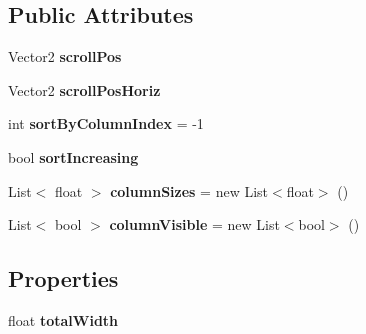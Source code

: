 \subsection*{Public Attributes}
\begin{DoxyCompactItemize}
\item 
\mbox{\label{class_editor_g_u_i_table_1_1_g_u_i_table_state_a5d522c1790784ff16db98b345b74a0ca}} 
Vector2 {\bfseries scroll\+Pos}
\item 
\mbox{\label{class_editor_g_u_i_table_1_1_g_u_i_table_state_ac9aaf765fd446c9e48b17b47528f647f}} 
Vector2 {\bfseries scroll\+Pos\+Horiz}
\item 
\mbox{\label{class_editor_g_u_i_table_1_1_g_u_i_table_state_ad4fe2697eec54139de525bb0b87be1b3}} 
int {\bfseries sort\+By\+Column\+Index} = -\/1
\item 
\mbox{\label{class_editor_g_u_i_table_1_1_g_u_i_table_state_a77f82460b4a1a57c23035e404ff47346}} 
bool {\bfseries sort\+Increasing}
\item 
\mbox{\label{class_editor_g_u_i_table_1_1_g_u_i_table_state_ade1dee36083109909f4bf31bd88d995e}} 
List$<$ float $>$ {\bfseries column\+Sizes} = new List$<$float$>$ ()
\item 
\mbox{\label{class_editor_g_u_i_table_1_1_g_u_i_table_state_a5351f180498096a8da853064d8a2e4d0}} 
List$<$ bool $>$ {\bfseries column\+Visible} = new List$<$bool$>$ ()
\end{DoxyCompactItemize}
\subsection*{Properties}
\begin{DoxyCompactItemize}
\item 
\mbox{\label{class_editor_g_u_i_table_1_1_g_u_i_table_state_ad2f4887bcadfd3fcdf6e4642e5be1d80}} 
float {\bfseries total\+Width}
\end{DoxyCompactItemize}


